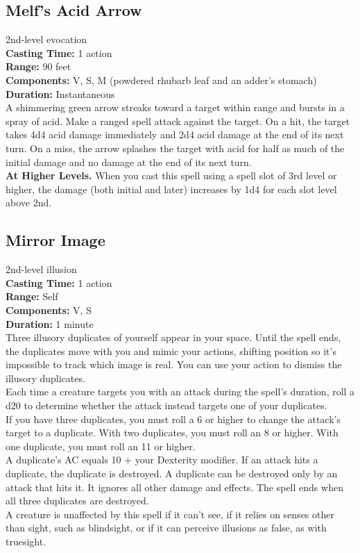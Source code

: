 \documentclass[11pt, A4paper, english]{article}
\begin{document}
		\subsection{Melf's Acid Arrow}
2nd-level evocation \\
\textbf{Casting Time:} 1 action \\
\textbf{Range:} 90 feet \\
\textbf{Components:} V, S, M (powdered rhubarb leaf and an adder’s stomach) \\
\textbf{Duration:} Instantaneous \\
A shimmering green arrow streaks toward a target within range and bursts in a spray of acid. Make a ranged spell attack against the target. On a hit, the target takes 4d4 acid damage immediately and 2d4 acid damage at the end of its next turn. On a miss, the arrow splashes the target with acid for half as much of the initial damage and no damage at the end of its next turn. \\
\textbf{At Higher Levels.} When you cast this spell using a spell slot of 3rd level or higher, the damage (both initial and later) increases by 1d4 for each slot level above 2nd.

		\subsection{Mirror Image}
2nd-level illusion \\
\textbf{Casting Time:} 1 action \\
\textbf{Range:} Self \\
\textbf{Components:} V, S \\
\textbf{Duration:} 1 minute \\
Three illusory duplicates of yourself appear in your space. Until the spell ends, the duplicates move with you and mimic your actions, shifting position so it’s impossible to track which image is real. You can use your action to dismiss the illusory duplicates. \\
Each time a creature targets you with an attack during the spell’s duration, roll a d20 to determine whether the attack instead targets one of your duplicates. \\
If you have three duplicates, you must roll a 6 or higher to change the attack’s target to a duplicate. With two duplicates, you must roll an 8 or higher. With one duplicate, you must roll an 11 or higher. \\
A duplicate’s AC equals 10 + your Dexterity modifier. If an attack hits a duplicate, the duplicate is destroyed. A duplicate can be destroyed only by an attack that hits it. It ignores all other damage and effects. The spell ends when all three duplicates are destroyed. \\
A creature is unaffected by this spell if it can’t see, if it relies on senses other than sight, such as blindsight, or if it can perceive illusions as false, as with truesight.
\end{document}

